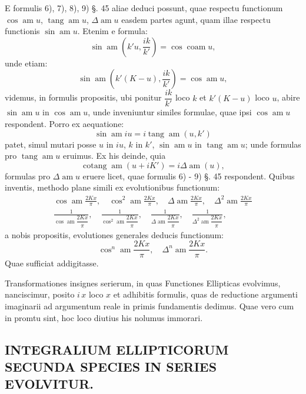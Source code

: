\documentclass{article}
\begin{document}
E formulis 6), 7), 8), 9) §. 45 aliae deduci possunt, quae respectu functionum $\cos\operatorname{am}u$, $\operatorname{tang}\operatorname{am}u$, $\Delta\operatorname{am}u$ easdem partes agunt, quam illae respectu functionis $\sin\operatorname{am}u$. Etenim e formula:
\[
\sin\operatorname{am}\left(k'u,\frac{ik}{k'}\right)=\cos\operatorname{coam}u,
\]
unde etiam:
\[
\sin\operatorname{am}\left(k'(K-u),\frac{ik}{k'}\right)=\cos\operatorname{am}u,
\]
videmus, in formulis propositis, ubi ponitur $\dfrac{ik}{k'}$ loco $k$ et $k'(K-u)$ loco $u$, abire $\sin\operatorname{am}u$ in $\cos\operatorname{am}u$, unde inveniuntur similes formulae, quae ipsi $\cos\operatorname{am}u$ respondent. Porro ex aequatione:
\[
\sin\operatorname{am}iu=i\operatorname{tang}\operatorname{am}(u,k')
\]
patet, simul mutari posse $u$ in $iu$, $k$ in $k'$, $\sin\operatorname{am}u$ in $\operatorname{tang}\operatorname{am}u$; unde formulas pro $\operatorname{tang}\operatorname{am}u$ eruimus. Ex his deinde, quia
\[
\operatorname{cotang}\operatorname{am}(u+iK')=i\Delta\operatorname{am}(u),
\]
formulas pro $\Delta\operatorname{am}u$ eruere licet, quae formulis 6) - 9) §. 45 respondent. Quibus inventis, methodo plane simili ex evolutionibus functionum:
\[
\begin{gathered}
\cos\operatorname{am}\frac{2Kx}{\pi},\quad\cos^{2}\operatorname{am}\frac{2Kx}{\pi},\quad\Delta\operatorname{am}\frac{2Kx}{\pi},\quad\Delta^{2}\operatorname{am}\frac{2Kx}{\pi}\\[1.5ex]
\frac{1}{\cos\operatorname{am}\dfrac{2Kx}{\pi}},\quad\frac{1}{\cos^{2}\operatorname{am}\dfrac{2Kx}{\pi}},\quad\frac{1}{\Delta\operatorname{am}\dfrac{2Kx}{\pi}},\quad\frac{1}{\Delta^{2}\operatorname{am}\dfrac{2Kx}{\pi}},
\end{gathered}
\]
a nobis propositis, evolutiones generales deducis functionum:
\[
\cos^{n}\operatorname{am}\frac{2Kx}{\pi},\quad\Delta^{n}\operatorname{am}\frac{2Kx}{\pi}.
\]
Quae sufficiat addigitasse.


Transformationes insignes serierum, in quas Functiones Ellipticas evolvimus, nanciscimur, posito $i\,x$ loco $x$ et adhibitis formulis, quas de reductione argumenti imaginarii ad argumentum reale in primis fundamentis dedimus. Quae vero cum in promtu sint, hoc loco diutius his nolumus immorari.

\subsection*{INTEGRALIUM ELLIPTICORUM SECUNDA SPECIES IN SERIES EVOLVITUR.}
\end{document}
